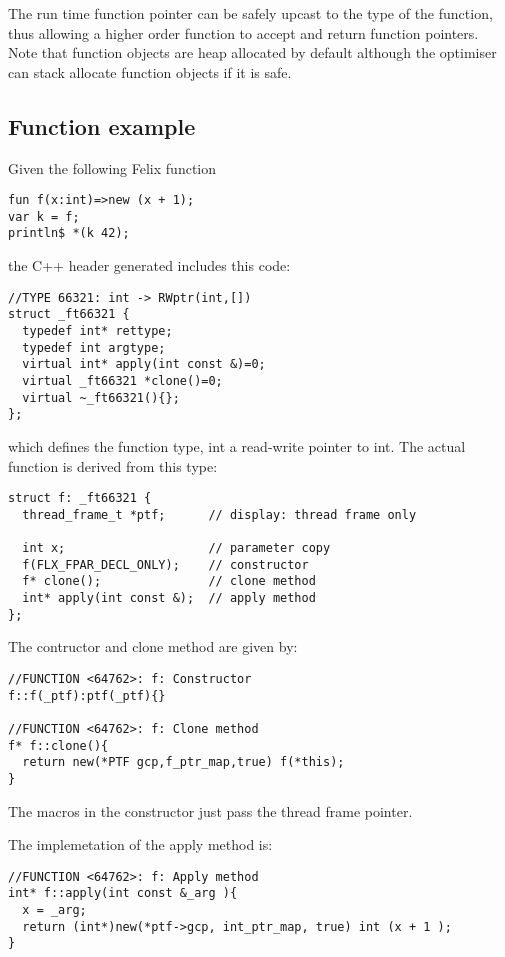 \documentclass[oneside]{book}
\begin{document}
The run time function pointer can be safely upcast to the type of the function,
thus allowing a higher order function to accept and return function pointers.
Note that function objects are heap allocated by default although the optimiser
can stack allocate function objects if it is safe.


\subsection{Function example}
Given the following Felix function 

\begin{verbatim}
fun f(x:int)=>new (x + 1);
var k = f;
println$ *(k 42);
\end{verbatim}

the C++ header generated includes this code:

\begin{verbatim}
//TYPE 66321: int -> RWptr(int,[])
struct _ft66321 {
  typedef int* rettype;
  typedef int argtype;
  virtual int* apply(int const &)=0;
  virtual _ft66321 *clone()=0;
  virtual ~_ft66321(){};
};
\end{verbatim}

which defines the function type, int a read-write pointer to int.
The actual function is derived from this type:

\begin{verbatim}
struct f: _ft66321 {
  thread_frame_t *ptf;      // display: thread frame only

  int x;                    // parameter copy
  f(FLX_FPAR_DECL_ONLY);    // constructor
  f* clone();               // clone method
  int* apply(int const &);  // apply method
};
\end{verbatim}

The contructor and clone method are given by:
\begin{verbatim}
//FUNCTION <64762>: f: Constructor
f::f(_ptf):ptf(_ptf){}

//FUNCTION <64762>: f: Clone method
f* f::clone(){
  return new(*PTF gcp,f_ptr_map,true) f(*this);
}
\end{verbatim}
The macros in the constructor just pass the thread frame pointer.

The implemetation of the apply method is:
\begin{verbatim}
//FUNCTION <64762>: f: Apply method
int* f::apply(int const &_arg ){
  x = _arg;
  return (int*)new(*ptf->gcp, int_ptr_map, true) int (x + 1 );
}
\end{verbatim}
\end{document}

